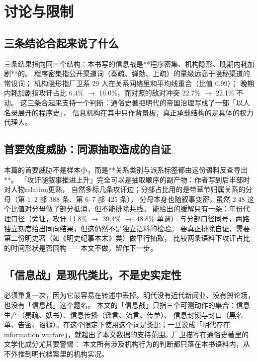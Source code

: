 \section{讨论与限制}

\subsection{三条结论合起来说了什么}

三条结果指向同一个结构：本书写的信息战是**程序密集、机构隐形、晚期内耗加剧**的。
程序密集指公开渠道词（奏疏、弹劾、上疏）的量级远高于隐秘渠道的常设词；
机构隐形指厂卫系 29 人在关系网络里和平均线重合（比值 $0.99$）；
晚期内耗加剧指攻讦占比 6.4\% $\to$ 16.0\%，而对照的敌对冲突 22.7\% $\to$ 22.1\% 不动。
这三条合起来支持一个判断：通俗史著把明代的帝国治理写成了一部「以人名录展开的程序史」，
信息机构在其中只作背景板，真正承载结构的是具体的权力代理人。

\subsection{首要效度威胁：同源抽取造成的自证}

本篇的首要威胁不是样本小，而是**关系类别与派系标签都由这份语料反查导出**。
「攻讦随叙事推进上升」完全可以是抽取顺序的副产物：作者写到后半部时对人物relation更熟，
自然多标几条攻讦边；分部占比用的是带章节归属关系的分母（第 1--2 部 388 条、第 6--7 部 425 条），
分母本身也随叙事变密，虽然 2.48 这个比值对分母做了部分抵消，但不能排除共线。
能给出的缓解只有一条：年份代理口径（旁证，攻讦 11.8\% $\to$ 39.4\% $\to$ 48.8\% 单调）
与分部口径同号，两路独立刻度给出同向结果，但这仍然不是独立语料的检验。
要真正排除自证，需要第二份明史著（如《明史纪事本末》类）做平行抽取，
比较两条语料下攻讦占比的时间形状是否同构——本文不做，留作下一步。

\subsection{「信息战」是现代类比，不是史实定性}

必须重复一次，因为它最容易在转述中丢掉。明代没有近代新闻业、没有舆论场，也没有「信息战」这个题名。
本文的「信息战」只指三个可测动作的集合：信息生产（奏疏、妖书）、信息传播（谣言、流言、传单）、
信息封锁与封口（黑名单、告密、诏狱）。在这个限定下使用这个词是类比；一旦说成「明代存在 information
warfare」，就超出了本文数据的支持范围。厂卫描写在通俗史著里的文学化成分尤其要警惕：
本文所有涉及机构行为的判断都只落在本书语料内，从不外推到明代档案里的机构实况。

